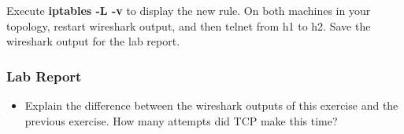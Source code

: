 \documentclass[10pt,a4paper]{article}
\numberwithin{equation}{section}
\numberwithin{figure}{section}
\numberwithin{table}{section}
\begin{document}
\setlength{\parindent}{0pt}
Execute \textbf{iptables -L -v} to display the new rule. On both machines in your topology, restart wireshark output, and then telnet from h1 to h2. Save the wireshark output for the lab report.

\subsubsection*{ Lab Report}
\begin{itemize}
	\setlength{\itemindent}{0pt}
	\item Explain the difference between the wireshark outputs of this exercise and the previous exercise. How many attempts did TCP make this time?
\end{itemize}
\end{document}
